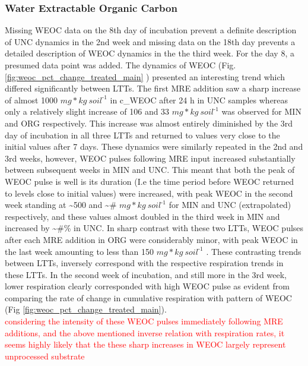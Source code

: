 \documentclass[12pt]{report}
\newcommand{\myRed}[1]{\textcolor{red}{#1}} %
\newlength{\SpaceAfterUnit}
\newcommand{\genericunit}{$ mg * kg\ soil^{\text{-}1}$ \hspace*{\SpaceAfterUnit}}
\begin{document}
	\subsubsection{Water Extractable Organic Carbon}
		Missing WEOC data on the 8th day of incubation prevent a definite description of UNC dynamics in the 2nd week and missing data on the 18th day prevents a detailed description of WEOC dynamics in the the third week. For the day 8, a presumed data point was added.			
		The dynamics of WEOC (Fig. \ref{fig:weoc_pct_change_treated_main} ) presented an interesting trend which differed significantly between LTTs. The first MRE addition saw a sharp increase of almost 1000 \genericunit in  c\_WEOC after 24 h in UNC samples whereas only a relatively slight increase of 106 and 33 \genericunit was observed for MIN and ORG respectively. This increase was almost entirely diminished by the 3rd day of incubation in all three LTTs and returned to values very close to the initial values after 7 days. These dynamics were similarly repeated in the 2nd and 3rd weeks, however, WEOC pulses following MRE input increased substantially between subsequent weeks in MIN and UNC. This meant that both the peak of WEOC pulse is well is its duration (I.e the time period before WEOC returned to levels close to initial values) were increased, with peak WEOC in the second week standing at \~{}500 and \~{}\# \genericunit for MIN and UNC (extrapolated) respectively, and these values almost doubled in the third week in MIN and increased by \~{}\#\% in UNC. In sharp contrast with these two LTTs, WEOC pulses after each MRE addition in ORG were considerably minor, with peak WEOC in the last week amounting to less than 150 \genericunit. 
		These contrasting trends between LTTs, inversely correspond with the respective respiration trends in these LTTs. In the second week of incubation, and still more in the 3rd week, lower respiration clearly corresponded with high WEOC pulse as evident from comparing the rate of change in cumulative respiration with pattern of WEOC (Fig \ref{fig:weoc_pct_change_treated_main}).\\
		\myRed{considering the intensity of these WEOC pulses immediately following MRE additions, and the above mentioned inverse relation with respiration rates, it seems highly likely that the these sharp increases in WEOC largely represent unprocessed substrate}
\end{document}
